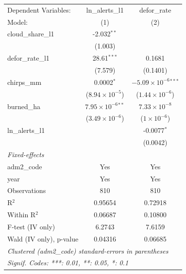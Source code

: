 \begingroup
\centering
\begin{tabular}{lcc}
   \tabularnewline \midrule \midrule
   Dependent Variables:    & ln\_alerts\_l1               & defor\_rate\\   
   Model:                  & (1)                          & (2)\\  
   \midrule
   cloud\_share\_l1        & -2.032$^{**}$                &   \\   
                           & (1.003)                      &   \\   
   defor\_rate\_l1         & 28.61$^{***}$                & 0.1681\\   
                           & (7.579)                      & (0.1401)\\   
   chirps\_mm              & 0.0002$^{*}$                 & $-5.09\times 10^{-6}$$^{***}$\\    
                           & ($8.94\times 10^{-5}$)       & ($1.44\times 10^{-6}$)\\    
   burned\_ha              & $7.95\times 10^{-6}$$^{**}$  & $7.33\times 10^{-8}$\\    
                           & ($3.49\times 10^{-6}$)       & ($1\times 10^{-6}$)\\    
   ln\_alerts\_l1          &                              & -0.0077$^{*}$\\   
                           &                              & (0.0042)\\   
   \midrule
   \emph{Fixed-effects}\\
   adm2\_code              & Yes                          & Yes\\  
   year                    & Yes                          & Yes\\  
   \midrule
   Observations            & 810                          & 810\\  
   R$^2$                   & 0.95654                      & 0.72918\\  
   Within R$^2$            & 0.06687                      & 0.10800\\  
   F-test (IV only)        & 6.2743                       & 7.6159\\  
   Wald (IV only), p-value & 0.04316                      & 0.06685\\  
   \midrule \midrule
   \multicolumn{3}{l}{\emph{Clustered (adm2\_code) standard-errors in parentheses}}\\
   \multicolumn{3}{l}{\emph{Signif. Codes: ***: 0.01, **: 0.05, *: 0.1}}\\
\end{tabular}
\par\endgroup
